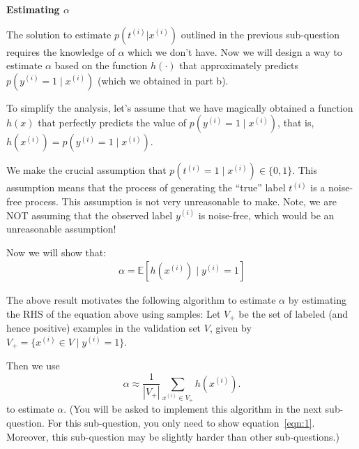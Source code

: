 \item {} \textbf{Estimating $\alpha$}


The solution to estimate $p(t^{(i)}|x^{(i)})$ outlined in the previous sub-question requires the knowledge of $\alpha$ which we don't have. Now we will design a way to estimate $\alpha$ based on the function $h(\cdot)$ that approximately predicts $p(y^{(i)}=1\mid x^{(i)})$ (which we obtained in part b).  

To simplify the analysis, let's assume that we have magically obtained a function $h(x)$ that perfectly predicts the value of $p(y^{(i)}=1\mid x^{(i)})$, that is, $h(x^{(i)} )= p(y^{(i)} = 1\mid x^{(i)})$.

We make the crucial assumption that $p(t^{(i)}=1\mid x^{(i)}) \in \{0,1\}$. This assumption means that the process of generating the ``true'' label $t^{(i)}$ is a noise-free process. This assumption is not very unreasonable to make. Note, we are NOT assuming that the observed label $y^{(i)}$ is noise-free, which would be an unreasonable assumption!

Now we will show that:
\begin{align}
\alpha = \mathbb{E}[h(x^{(i)})\mid y^{(i)}=1] \label{eqn:1}
\end{align}

The above result motivates the following algorithm to estimate $\alpha$ by estimating the RHS of the equation above using samples: 
Let $V_{+}$ be the set of labeled (and hence positive) examples in the validation set $V$, given by $V_{+} = \{x^{(i)}\in V\mid y^{(i)} = 1\}$.

Then we use 
\begin{equation*}
\alpha \approx \frac{1}{|V_{+}|}\sum_{x^{(i)}\in V_{+}} h(x^{(i)}).
\end{equation*}
to estimate $\alpha$. (You will be asked to implement this algorithm in the next sub-question. For this sub-question, you only need to show equation~\eqref{eqn:1}. Moreover, this sub-question may be slightly harder than other sub-questions.)

